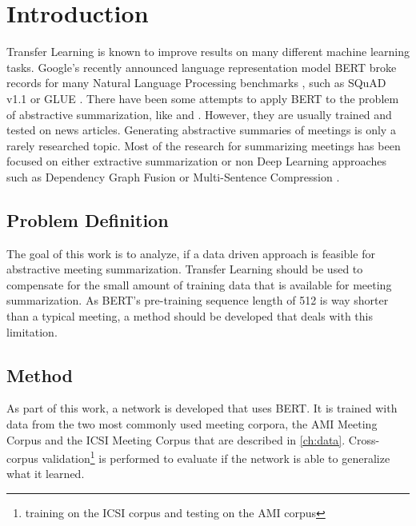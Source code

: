 \chapter{Introduction}\label{ch:Introduction}


Transfer Learning is known to improve results on many different machine learning tasks.
Google's recently announced language representation model BERT broke records for many Natural Language Processing benchmarks \cite[p.~5--7]{devlin2018bert}, such as  SQuAD v1.1 \cite{rajpurkar-etal-2016-squad} or GLUE \cite{1804.07461}.
There have been some attempts to apply BERT to the problem of abstractive summarization, like \cite{1902.09243} and \cite{1908.08345}.
However, they are usually trained and tested on news articles.
Generating abstractive summaries of meetings is only a rarely researched topic.
Most of the research for summarizing meetings has been focused on either extractive summarization or non Deep Learning approaches such as Dependency Graph Fusion \cite{1609.07035} or Multi-Sentence Compression \cite{shang-etal-2018-unsupervised}.


\section{Problem Definition}

The goal of this work is to analyze, if a data driven approach is feasible for abstractive meeting summarization.
Transfer Learning should be used to compensate for the small amount of training data that is available for meeting summarization.
As BERT's pre-training sequence length of 512 \cite[p.~13]{devlin2018bert} is way shorter than a typical meeting, a method should be developed that deals with this limitation.


\section{Method}

As part of this work, a network is developed that uses BERT.
It is trained with data from the two most commonly used meeting corpora, the AMI Meeting Corpus \cite{Mccowan05theami} and the ICSI Meeting Corpus \cite{Janin} that are described in \cref{ch:data}.
Cross-corpus validation\footnote{\Eg training on the ICSI corpus and testing on the AMI corpus} is performed to evaluate if the network is able to generalize what it learned.

